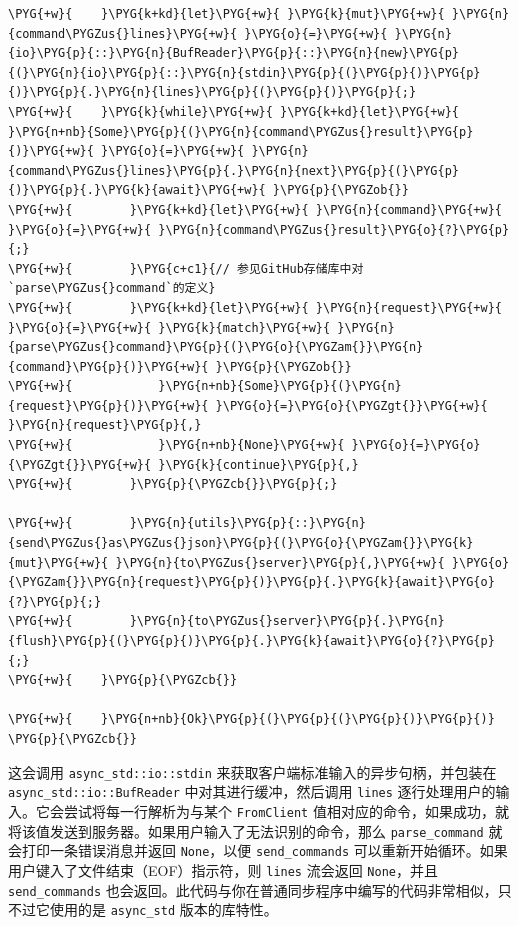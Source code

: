 \begin{Verbatim}[commandchars=\\\{\},breaklines=true,breakanywhere=true,fontsize=\codefont,xleftmargin=17bp]
\PYG{+w}{    }\PYG{k+kd}{let}\PYG{+w}{ }\PYG{k}{mut}\PYG{+w}{ }\PYG{n}{command\PYGZus{}lines}\PYG{+w}{ }\PYG{o}{=}\PYG{+w}{ }\PYG{n}{io}\PYG{p}{::}\PYG{n}{BufReader}\PYG{p}{::}\PYG{n}{new}\PYG{p}{(}\PYG{n}{io}\PYG{p}{::}\PYG{n}{stdin}\PYG{p}{(}\PYG{p}{)}\PYG{p}{)}\PYG{p}{.}\PYG{n}{lines}\PYG{p}{(}\PYG{p}{)}\PYG{p}{;}
\PYG{+w}{    }\PYG{k}{while}\PYG{+w}{ }\PYG{k+kd}{let}\PYG{+w}{ }\PYG{n+nb}{Some}\PYG{p}{(}\PYG{n}{command\PYGZus{}result}\PYG{p}{)}\PYG{+w}{ }\PYG{o}{=}\PYG{+w}{ }\PYG{n}{command\PYGZus{}lines}\PYG{p}{.}\PYG{n}{next}\PYG{p}{(}\PYG{p}{)}\PYG{p}{.}\PYG{k}{await}\PYG{+w}{ }\PYG{p}{\PYGZob{}}
\PYG{+w}{        }\PYG{k+kd}{let}\PYG{+w}{ }\PYG{n}{command}\PYG{+w}{ }\PYG{o}{=}\PYG{+w}{ }\PYG{n}{command\PYGZus{}result}\PYG{o}{?}\PYG{p}{;}
\PYG{+w}{        }\PYG{c+c1}{// 参见GitHub存储库中对`parse\PYGZus{}command`的定义}
\PYG{+w}{        }\PYG{k+kd}{let}\PYG{+w}{ }\PYG{n}{request}\PYG{+w}{ }\PYG{o}{=}\PYG{+w}{ }\PYG{k}{match}\PYG{+w}{ }\PYG{n}{parse\PYGZus{}command}\PYG{p}{(}\PYG{o}{\PYGZam{}}\PYG{n}{command}\PYG{p}{)}\PYG{+w}{ }\PYG{p}{\PYGZob{}}
\PYG{+w}{            }\PYG{n+nb}{Some}\PYG{p}{(}\PYG{n}{request}\PYG{p}{)}\PYG{+w}{ }\PYG{o}{=}\PYG{o}{\PYGZgt{}}\PYG{+w}{ }\PYG{n}{request}\PYG{p}{,}
\PYG{+w}{            }\PYG{n+nb}{None}\PYG{+w}{ }\PYG{o}{=}\PYG{o}{\PYGZgt{}}\PYG{+w}{ }\PYG{k}{continue}\PYG{p}{,}
\PYG{+w}{        }\PYG{p}{\PYGZcb{}}\PYG{p}{;}

\PYG{+w}{        }\PYG{n}{utils}\PYG{p}{::}\PYG{n}{send\PYGZus{}as\PYGZus{}json}\PYG{p}{(}\PYG{o}{\PYGZam{}}\PYG{k}{mut}\PYG{+w}{ }\PYG{n}{to\PYGZus{}server}\PYG{p}{,}\PYG{+w}{ }\PYG{o}{\PYGZam{}}\PYG{n}{request}\PYG{p}{)}\PYG{p}{.}\PYG{k}{await}\PYG{o}{?}\PYG{p}{;}
\PYG{+w}{        }\PYG{n}{to\PYGZus{}server}\PYG{p}{.}\PYG{n}{flush}\PYG{p}{(}\PYG{p}{)}\PYG{p}{.}\PYG{k}{await}\PYG{o}{?}\PYG{p}{;}
\PYG{+w}{    }\PYG{p}{\PYGZcb{}}

\PYG{+w}{    }\PYG{n+nb}{Ok}\PYG{p}{(}\PYG{p}{(}\PYG{p}{)}\PYG{p}{)}
\PYG{p}{\PYGZcb{}}
\end{Verbatim}

这会调用 \texttt{async\_std::io::stdin} 来获取客户端标准输入的异步句柄，并包装在 \texttt{async\_std::io::BufReader} 中对其进行缓冲，然后调用 \texttt{lines} 逐行处理用户的输入。它会尝试将每一行解析为与某个 \texttt{FromClient} 值相对应的命令，如果成功，就将该值发送到服务器。如果用户输入了无法识别的命令，那么 \texttt{parse\_command} 就会打印一条错误消息并返回 \texttt{None}，以便 \texttt{send\_commands} 可以重新开始循环。如果用户键入了文件结束（EOF）指示符，则 \texttt{lines} 流会返回 \texttt{None}，并且 \texttt{send\_commands} 也会返回。此代码与你在普通同步程序中编写的代码非常相似，只不过它使用的是 \texttt{async\_std} 版本的库特性。

